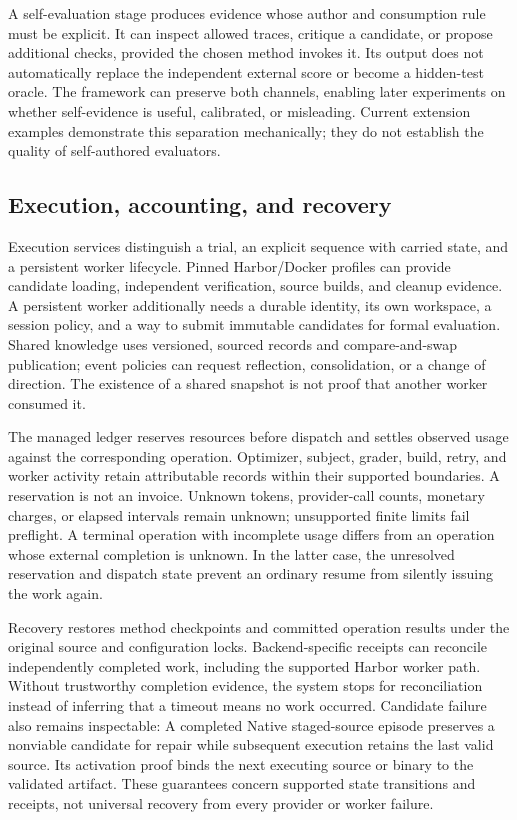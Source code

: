 A self-evaluation stage produces evidence whose author and consumption rule must be explicit. It can inspect allowed traces, critique a candidate, or propose additional checks, provided the chosen method invokes it. Its output does not automatically replace the independent external score or become a hidden-test oracle. The framework can preserve both channels, enabling later experiments on whether self-evidence is useful, calibrated, or misleading. Current extension examples demonstrate this separation mechanically; they do not establish the quality of self-authored evaluators.

\subsection{Execution, accounting, and recovery}
Execution services distinguish a trial, an explicit sequence with carried state, and a persistent worker lifecycle. Pinned Harbor/Docker profiles can provide candidate loading, independent verification, source builds, and cleanup evidence. A persistent worker additionally needs a durable identity, its own workspace, a session policy, and a way to submit immutable candidates for formal evaluation. Shared knowledge uses versioned, sourced records and compare-and-swap publication; event policies can request reflection, consolidation, or a change of direction. The existence of a shared snapshot is not proof that another worker consumed it.

The managed ledger reserves resources before dispatch and settles observed usage against the corresponding operation. Optimizer, subject, grader, build, retry, and worker activity retain attributable records within their supported boundaries. A reservation is not an invoice. Unknown tokens, provider-call counts, monetary charges, or elapsed intervals remain unknown; unsupported finite limits fail preflight. A terminal operation with incomplete usage differs from an operation whose external completion is unknown. In the latter case, the unresolved reservation and dispatch state prevent an ordinary resume from silently issuing the work again.

Recovery restores method checkpoints and committed operation results under the original source and configuration locks. Backend-specific receipts can reconcile independently completed work, including the supported Harbor worker path. Without trustworthy completion evidence, the system stops for reconciliation instead of inferring that a timeout means no work occurred. Candidate failure also remains inspectable: A completed Native staged-source episode preserves a nonviable candidate for repair while subsequent execution retains the last valid source. Its activation proof binds the next executing source or binary to the validated artifact. These guarantees concern supported state transitions and receipts, not universal recovery from every provider or worker failure.

